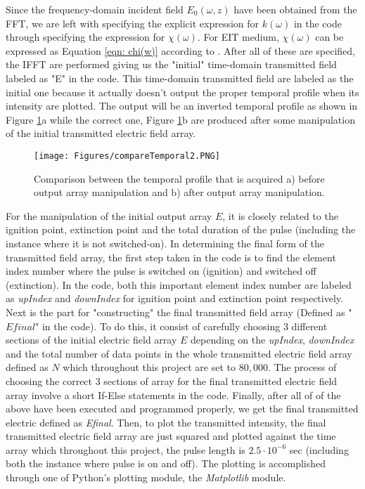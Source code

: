 Since the frequency-domain incident field $E_{0}(\omega, z)$ have been obtained from the FFT, we are left with specifying the explicit expression for $k(\omega)$ in the code through specifying the expression for $\chi(\omega)$. For EIT medium, $\chi(\omega)$ can be expressed as Equation \ref{eqn: chi(w)} according to \cite{Jeong2009, Braje2004}. After all of these are specified, the IFFT are performed giving us the "initial" time-domain transmitted field labeled as "E" in the code. This time-domain transmitted field are labeled as the initial one because it actually doesn't output the proper temporal profile when its intensity are plotted. The output will be an inverted temporal profile as shown in Figure \ref{fig: compare temporal}a while the correct one, Figure \ref{fig: compare temporal}b are produced after some manipulation of the initial transmitted electric field array.

\begin{figure}[h!]
    \centering
    \texttt{[image: Figures/compareTemporal2.PNG]}
    \caption{Comparison between the temporal profile that is acquired a) before output array manipulation and b) after output array manipulation.}
    \label{fig: compare temporal}
\end{figure}

For the manipulation of the initial output array $E$, it is closely related to the ignition point, extinction point and the total duration of the pulse (including the instance where it is not switched-on). In determining the final form of the transmitted field array, the first step taken in the code is to find the element index number where the pulse is switched on (ignition) and switched off (extinction). In the code, both this important element index number are labeled as \textit{upIndex} and \textit{downIndex} for ignition point and extinction point respectively. Next is the part for "constructing" the final transmitted field array (Defined as "$Efinal$" in the code). To do this, it consist of carefully choosing 3 different sections of the initial electric field array $E$ depending on the \textit{upIndex}, \textit{downIndex} and the total number of data points in the whole transmitted electric field array defined as $N$ which throughout this project are set to $80,000$. The process of choosing the correct 3 sections of array for the final transmitted electric field array involve a short If-Else statements in the code. Finally, after all of of the above have been executed and programmed properly, we get the final transmitted electric defined as \textit{Efinal}. Then, to plot the transmitted intensity, the final transmitted electric field array are just squared and plotted against the time array which throughout this project, the pulse length is $2.5 \cdot 10^{-6}$ sec (including both the instance where pulse is on and off). The plotting is accomplished through one of Python's plotting module, the \textit{Matplotlib} module.

